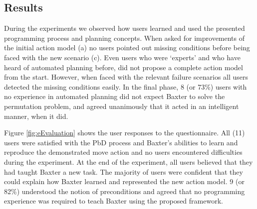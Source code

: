 \subsection{Results}
During the experiments we observed how users learned and used the presented programming process and planning concepts.
When asked for improvements of the initial action model (a) no users pointed out missing conditions before being faced with the new scenario (c).
Even users who were `experts' and who have heard of automated planning before, did not propose a complete action model from the start. 
However, when faced with the relevant failure scenarios all users detected the missing conditions easily.
In the final phase, 8 (or 73\%) users with no experience in automated planning did not expect Baxter to solve the permutation problem, and agreed unanimously that it acted in an intelligent manner, when it did. 

Figure \ref{fig:eEvaluation} shows the user responses to the questionnaire.
All (11) users were satisfied with the PbD process and Baxter's abilities to learn and reproduce the demonstrated move action and no users encountered difficulties during the experiment. 
At the end of the experiment, all users believed that they had taught Baxter a new task. 
The majority of users were confident that they could explain how Baxter learned and represented the new action model.
9 (or 82\%) understood the notion of preconditions and agreed that no programming experience was required to teach Baxter using the proposed framework.


